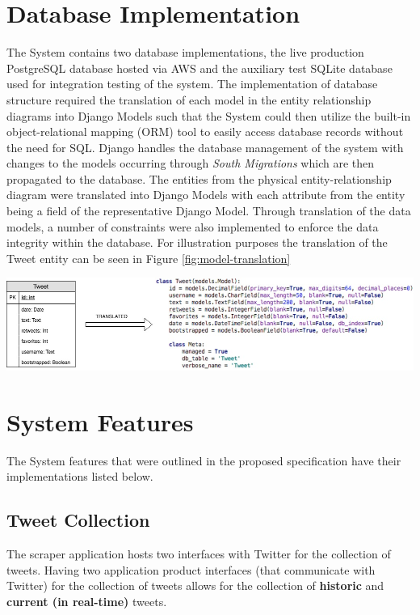 \documentclass[11pt]{report}
\begin{document}
\section{Database Implementation}
The System contains two database implementations, the live production PostgreSQL database hosted via AWS and the auxiliary test SQLite database used for integration testing of the system. The implementation of database structure required the translation of each model in the entity relationship diagrams into Django Models such that the System could then utilize the built-in object-relational mapping (ORM) tool to easily access database records without the need for SQL. Django handles the database management of the system with changes to the models occurring through \textit{South Migrations} which are then propagated to the database. The entities from the physical entity-relationship diagram were translated into Django Models with each attribute from the entity being a field of the representative Django Model. Through translation of the data models, a number of constraints were also implemented to enforce the data integrity within the database. For illustration purposes the translation of the Tweet entity can be seen in Figure \ref{fig:model-translation}

\begin{center}
  \includegraphics[width=16cm]{images/model-translation.jpg}
  \label{fig:model-translation}
\end{center}
\clearpage

\section{System Features}
The System features that were outlined in the proposed specification have their implementations listed below.

\subsection*{Tweet Collection}
The scraper application hosts two interfaces with Twitter for the collection of tweets. Having two application product interfaces (that communicate with Twitter) for the collection of tweets allows for the collection of \textbf{historic} and \textbf{current (in real-time)} tweets.
\end{document}
